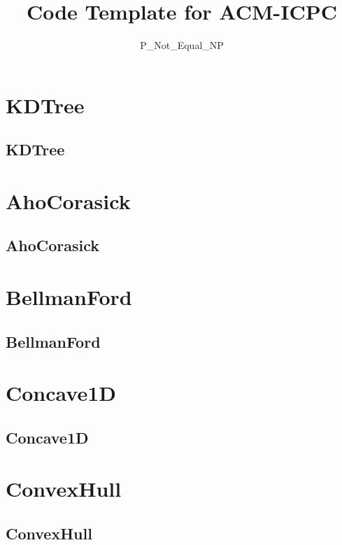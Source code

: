 \documentclass[a4paper, twocolumn]{article}
\title{Code Template for ACM-ICPC}
\author{P\_Not\_Equal\_NP}
\begin{document}
\begin{titlepage}
\maketitle
\thispagestyle{empty}
\pagebreak
\pagestyle{fancy}
\lhead{}
\rhead{}
\cfoot{}
\tableofcontents
\end{titlepage}

\pagestyle{fancy}
\cfoot{- \thepage \ -}
  
\section{KDTree}
\subsection{KDTree}

\section{AhoCorasick}
\subsection{AhoCorasick}

\section{BellmanFord}
\subsection{BellmanFord}

\section{Concave1D}
\subsection{Concave1D}

\section{ConvexHull}
\subsection{ConvexHull}

\end{document}
